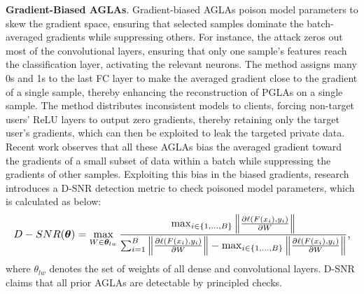 \textbf{Gradient-Biased AGLAs}.
Gradient-biased AGLAs \cite{zhang2022compromise, pasquini2022eluding, wen2022fishing, Garov2024Hiding} poison model parameters to skew the gradient space, ensuring that selected samples dominate the batch-averaged gradients while suppressing others. For instance, the attack \cite{zhang2022compromise} zeros out most of the convolutional layers, ensuring that only one sample's features reach the classification layer, activating the relevant neurons.  The method \cite{wen2022fishing} assigns many 0s and 1s to the last FC layer to make the averaged gradient close to the gradient of a single sample, thereby enhancing the reconstruction of PGLAs on a single sample. The method \cite{pasquini2022eluding} distributes inconsistent models to clients, forcing non-target users’ ReLU layers \cite{nair2010rectified} to output zero gradients, thereby retaining only the target user’s gradients, which can then be exploited to leak the targeted private data. Recent work \cite{Garov2024Hiding} observes that all these AGLAs bias the averaged gradient toward the gradients of a small subset of data within a batch while suppressing the gradients of other samples. Exploiting this bias in the biased gradients, research \cite{Garov2024Hiding} introduces a D-SNR detection metric to check poisoned model parameters, which is calculated as below:
\begin{equation}
\label{dsnr}
\resizebox{\linewidth}{!}{$
\begin{aligned}
    D-SNR(\boldsymbol{\theta})= \max_{W\in\boldsymbol{\theta}_{lw}}\frac{\max_{i\in\{1,...,B\}}\left\|\frac{\partial\ell(F(x_i),y_i)}{\partial W}\right\|}{\sum_{i=1}^B\left\|\frac{\partial\ell(F(x_i),y_i)}{\partial W}\right\|-\max_{i\in\{1,...,B\}}\left\|\frac{\partial\ell(F(x_i),y_i)}{\partial W}\right\|},
\end{aligned}
$}
\end{equation}
where ${\theta}_{lw}$ denotes the set of weights of all dense and convolutional layers. D-SNR claims that all prior AGLAs are detectable by principled checks.



